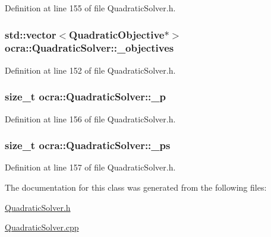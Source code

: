 Definition at line 155 of file Quadratic\+Solver.\+h.

\subsubsection[{\texorpdfstring{\+\_\+objectives}{_objectives}}]{\setlength{\rightskip}{0pt plus 5cm}std\+::vector$<${\bf Quadratic\+Objective}$\ast$$>$ ocra\+::\+Quadratic\+Solver\+::\+\_\+objectives\hspace{0.3cm}{\ttfamily [protected]}}\hypertarget{classocra_1_1QuadraticSolver_a5c5ba942644eceb02326095343a642cb}{}\label{classocra_1_1QuadraticSolver_a5c5ba942644eceb02326095343a642cb}


Definition at line 152 of file Quadratic\+Solver.\+h.

\subsubsection[{\texorpdfstring{\+\_\+p}{_p}}]{\setlength{\rightskip}{0pt plus 5cm}size\+\_\+t ocra\+::\+Quadratic\+Solver\+::\+\_\+p\hspace{0.3cm}{\ttfamily [protected]}}\hypertarget{classocra_1_1QuadraticSolver_aee2e8409ab5338029910a78e2e196cd3}{}\label{classocra_1_1QuadraticSolver_aee2e8409ab5338029910a78e2e196cd3}


Definition at line 156 of file Quadratic\+Solver.\+h.

\subsubsection[{\texorpdfstring{\+\_\+ps}{_ps}}]{\setlength{\rightskip}{0pt plus 5cm}size\+\_\+t ocra\+::\+Quadratic\+Solver\+::\+\_\+ps\hspace{0.3cm}{\ttfamily [protected]}}\hypertarget{classocra_1_1QuadraticSolver_a8818ed9913cda8253fd181e46e963f58}{}\label{classocra_1_1QuadraticSolver_a8818ed9913cda8253fd181e46e963f58}


Definition at line 157 of file Quadratic\+Solver.\+h.



The documentation for this class was generated from the following files\+:\begin{DoxyCompactItemize}
\item 
\hyperlink{QuadraticSolver_8h}{Quadratic\+Solver.\+h}\item 
\hyperlink{QuadraticSolver_8cpp}{Quadratic\+Solver.\+cpp}\end{DoxyCompactItemize}
